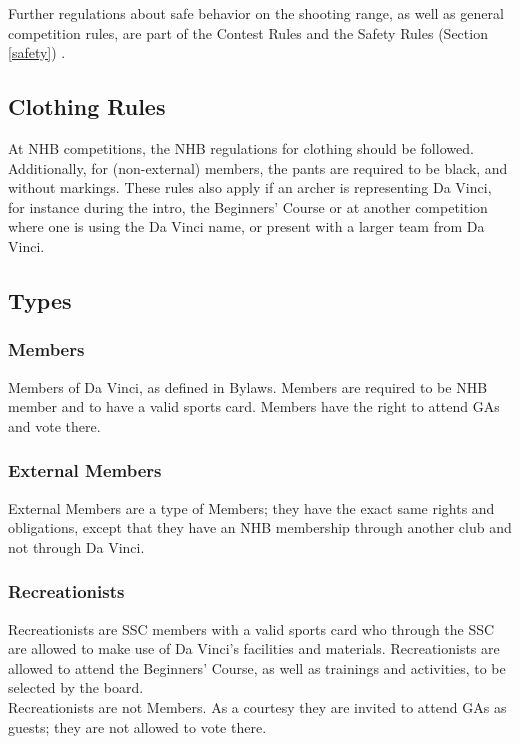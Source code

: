 \documentclass[a4paper]{article}
\newcommand{\Asta}{Bylaws} %
\newcommand{\Asr}{Safety Rules} %
\newcommand{\Awr}{Contest Rules} %
\begin{document}
Further regulations about safe behavior on the shooting range, as well as general competition rules, are part of the { \Awr} and the { \Asr} (Section \ref{safety}) .

\subsection{Clothing Rules}
\label{section:clubclothing}
At { NHB} competitions, the { NHB} regulations for clothing should be followed. Additionally, for { (non-external) members}, the pants are required to be black, and without markings. These rules also apply if an { archer} is representing Da Vinci, for instance during the intro, the {  Beginners' Course} or at another competition where one is using the Da Vinci name, or present with a larger team from Da Vinci. 

\subsection{Types}
\subsubsection{Members}
{ Members} of Da Vinci, as defined in { \Asta}. { Members} are required to be { NHB} member and to have a valid sports card. { Members} have the right to attend { GA}s and vote there.

\subsubsection{External Members}
{ External Members} are a type of { Members}; they have the exact same rights and obligations, except that they have an { NHB} membership through another club and not through Da Vinci.

\subsubsection{Recreationists}
{ Recreationists} are { SSC} members with a valid sports card who through the { SSC} are allowed to make use of Da Vinci's facilities and materials. { Recreationists} are allowed to attend the { Beginners' Course}, as well as trainings and activities, to be selected by the board. \\

{ Recreationists} are not { Members}. As a courtesy they are invited to attend { GA}s as guests; they are not allowed to vote there.
\end{document}
